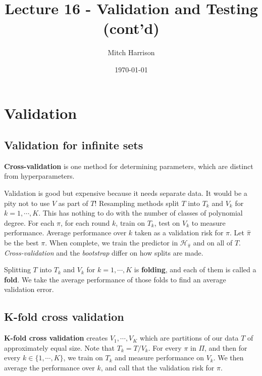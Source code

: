 \documentclass[titlepage, 12pt, leqno]{article}
\title{\Huge{Lecture 16 - Validation and Testing (cont'd)}}
\author{\large{Mitch Harrison}}
\date{\today}
\begin{document}
\setlength{\parskip}{1\baselineskip}
\setlength{\parindent}{15pt}
\maketitle
\tableofcontents
\newpage


\section{Validation}

\subsection{Validation for infinite sets}
\begin{definition}
    \textbf{Cross-validation} is one method for determining parameters, which
    are distinct from hyperparameters.
\end{definition}

Validation is good but expensive because it needs separate data. It would be a
pity not to use $V$ as part of $T$! Resampling methods split $T$ into $T_{k}$
and $V_{k}$ for $k = 1, \cdots , K$. This has nothing to do with the number of
classes of polynomial degree. For each $\pi$, for each round $k$, train on
$T_{k}$, test on $V_{k}$ to measure performance. Average performance over $k$
taken as a validation risk for $\pi$. Let $\hat \pi$ be the best $\pi$. When
complete, we train the predictor in $\mathcal{H}_{\hat \pi}$ and on all of 
$T$. \textit{Cross-validation} and the \textit{bootstrap} differ on how splits
are made.

\begin{definition}
    Splitting $T$ into $T_{k}$ and $V_{k}$ for $k=1, \cdots ,K$ is 
    \textbf{folding}, and each of them is called a \textbf{fold}. We take the
    average performance of those folds to find an average validation error.
\end{definition}

\subsection{K-fold cross validation}
\textbf{K-fold cross validation} creates $V_{1}, \cdots , V_{K}$ which are
partitions of our data $T$ of approximately equal size. Note that 
$T_{k} = T / V_{k}$. For every $\pi$ in $\Pi$, and then for every $k \in 
\{1, \cdots ,K\}$, we train on $T_{k}$ and measure performance on 
$V_{k}$. We then average the performance over $k$, and call that the 
validation risk for $\pi$. 
\end{document}
